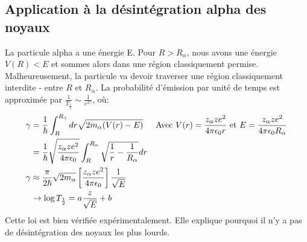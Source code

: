 \documentclass[../notesdecours]{subfiles}
\begin{document}
\subsection{Application à la désintégration alpha des noyaux}

La particule alpha a une énergie E. Pour $R>R_\alpha$, nous avons une énergie $V(R)<E$ et sommes alors dans une région classiquement permise. Malheureusement, la particule va devoir traverser une région classiquement interdite - entre $R$ et $R_\alpha$. La probabilité d'émission par unité de temps est approximée par $\frac{1}{T_{\frac{1}{2}}} \sim \frac{1}{e^{2\gamma}}$, où:
\begin{align}
\gamma &= \frac{1}{\hbar} \int_R^{R_\gamma} dr\sqrt{2m_\alpha (V(r)-E)}		&\text{Avec } V(r) = \frac{z_\alpha ze^2}{4\pi\epsilon_0r} \text{ et } E = \frac{z_\alpha ze^2}{4\pi\epsilon_0R_\alpha}\\
&= \frac{1}{\hbar} \sqrt{\frac{z_\alpha ze^2}{4\pi\epsilon_0}} \int_R^{R_\alpha} \sqrt{\frac{1}{r} - \frac{1}{R_\alpha}} dr\\
\gamma &\approx \frac{\pi}{2\hbar} \sqrt{2m_\alpha} \left[\frac{z_\alpha ze^2}{4\pi\epsilon_0}\right]\frac{1}{\sqrt{E}}\\
&\rightarrow \log T_{\frac{1}{2}} = a\frac{z}{\sqrt{E}} + b
\end{align}
Cette loi est bien vérifiée expérimentalement. Elle explique pourquoi il n'y a pas de désintégration des noyaux les plus lourds.\\
\end{document}
